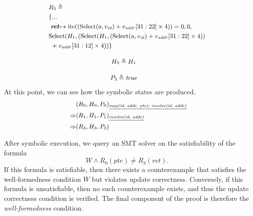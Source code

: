 
\begin{equation}
\label{state_3}
\small
\begin{aligned}
& R_{3} \triangleq \\
&\{...\\
      &\ \textit{\textbf{ret}}\!\mapsto \text{ite}((\text{Select}(a, v_{\mathit{id}}) + v_{\mathit{addr}}[31:22] \times 4)) = 0, 0,\\
      &\text{Select}(H_1, (\text{Select}(H_1, (\text{Select}(a, v_{\mathit{id}}) + v_{\mathit{addr}}[31:22] \times 4)) \\
      &\ + v_{\mathit{addr}}[31:12] \times 4))\}
\end{aligned}
\end{equation}

\begin{equation}
\small
\begin{aligned}
& H_{3} \triangleq H_{1}
\end{aligned}
\end{equation}

\begin{equation}
\small
\begin{aligned}
& P_{3} \triangleq \textit{true}
\end{aligned}
\end{equation}
At this point, we can see how the symbolic states are produced.
\begin{equation}\
\label{progress}
\small
\begin{aligned}
&(R_0, H_0, P_0)_{\underline{\textit{map(id, addr, pte); resolve(id, addr)}}} \\\Rightarrow &(R_1, H_1, P_1)_{\underline{\textit{resolve(id, addr)}}}\\
\Rightarrow &(R_3, H_3, P_3)
\end{aligned}
\end{equation}

After symbolic execution, we query an SMT solver on the satisfiability of the formula 
\[W \wedge R_0(\textit{pte}) \neq R_3(\textit{ret}).\]If this formula is satisfiable, then there exists a counterexample that satisfies the well-formedness condition $W$ but violates update correctness. Conversely, if this formula is unsatisfiable, then no such counterexample exists, and thus the update correctness condition is verified. The final component of the proof is therefore the \emph{well-formedness} condition.

